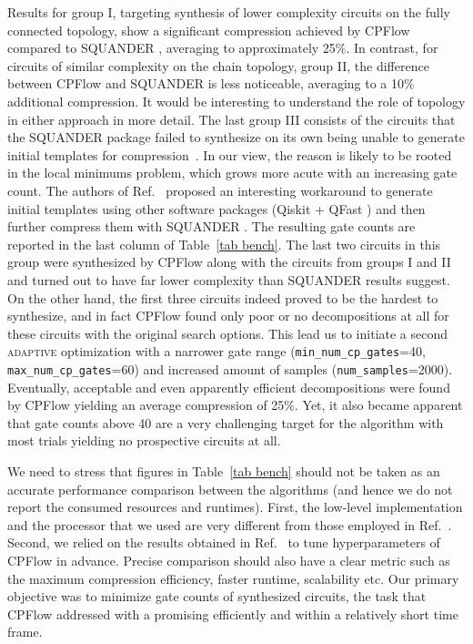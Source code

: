 \documentclass[draft, twocolumn, amsfonts, amssymb, aps, nofootinbib]{revtex4-2}
\newcommand{\package}[1]{\textrm {#1 }}
\newcommand{\cpflow}{\package{CPFlow}}
\newcommand{\adaptive}{\textsc{adaptive }}
\newcommand{\param}[1]{\texttt{#1}}
\begin{document}
Results for group I, targeting synthesis of lower complexity circuits on the fully connected  topology, show a significant compression achieved by \cpflow compared to \package{SQUANDER}, averaging to approximately 25\%. In contrast, for circuits of similar complexity on the chain topology, group II, the difference between \package{CPFlow} and \package{SQUANDER} is less noticeable, averaging to a 10\% additional compression. It would be interesting to understand the role of topology in either approach in more detail. The last group III consists of the circuits that the \package{SQUANDER} package failed to synthesize on its own being unable to generate initial templates for compression~\cite{Rakyta2022}. In our view, the reason is likely to be rooted in the local minimums problem, which grows more acute with an increasing gate count. The authors of Ref.~\cite{Rakyta2022} proposed an interesting workaround to generate initial templates using other software packages (\package{Qiskit}+ \package{QFast}) and then further compress them with \package{SQUANDER}. The resulting gate counts are reported in the last column of Table~\ref{tab bench}. The last two circuits in this group were synthesized by \cpflow along with  the circuits from groups I and II and turned out to have far lower complexity than \package{SQUANDER} results suggest. On the other hand, the first three circuits indeed proved to be the hardest to synthesize, and in fact \cpflow found only poor or no decompositions at all for these circuits with the original search options. This lead us to initiate a second \adaptive optimization with a narrower gate range (\param{min\_num\_cp\_gates}=40, \param{max\_num\_cp\_gates}=60) and increased amount of samples (\param{num\_samples}=2000). Eventually, acceptable and even apparently efficient decompositions were found by \cpflow yielding an average compression of 25\%. Yet, it also became apparent that gate counts above 40 are a very challenging target for the algorithm with most trials yielding no prospective circuits at all.

We need to stress that figures in Table~\ref{tab bench} should not be taken as an accurate performance comparison between the algorithms (and hence we do not report the consumed resources and runtimes). First, the low-level implementation and the processor that we used are very different from those employed in Ref.~\cite{Rakyta2022}. Second, we relied on the results obtained in Ref.~\cite{Rakyta2022} to tune hyperparameters of \cpflow in advance. Precise comparison should also have a clear metric such as the maximum compression efficiency, faster runtime, scalability etc. Our primary objective was to minimize gate counts of synthesized circuits, the task that \cpflow addressed with a promising efficiently and within a relatively short time frame.
\end{document}
